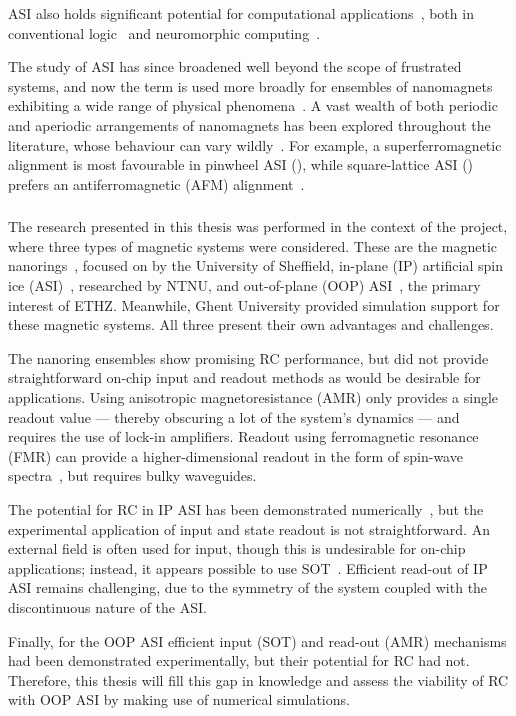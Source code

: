 ASI also holds significant potential for computational applications~\cite{heyderman2022spin}, both in conventional logic~\cite{ComputationalLogic_2018,Gypens_Balanced,EngineeringRelaxationComputation} and neuromorphic computing~\cite{ASI_computation,RC_RecentAdvances}. \par
The study of ASI has since broadened well beyond the scope of frustrated systems, and now the term is used more broadly for ensembles of nanomagnets exhibiting a wide range of physical phenomena~\cite{ASIPathsForward}.
A vast wealth of both periodic and aperiodic arrangements of nanomagnets has been explored throughout the literature, whose behaviour can vary wildly~\cite{nisoli2013colloquium,heyderman2013artificial,AdvancesASI,ASI_Evolutionary_ALife}.
For example, a superferromagnetic alignment is most favourable in pinwheel ASI (), while square-lattice ASI () prefers an antiferromagnetic (AFM) alignment~\cite{ApparentFMpinwheel}.

\subsubsection{\spinengine}
The research presented in this thesis was performed in the context of the \spinengine project, where three types of magnetic systems were considered.
These are the magnetic nanorings~\cite{DynamicEmergence_NanomagneticSystem}, focused on by the University of Sheffield, in-plane (IP) artificial spin ice (ASI)~\cite{RC_ASI}, researched by NTNU, and out-of-plane (OOP) ASI~\cite{KUR-24}, the primary interest of ETHZ.
Meanwhile, Ghent University provided simulation support for these magnetic systems.
All three present their own advantages and challenges. \par
The nanoring ensembles show promising RC performance, but did not provide straightforward on-chip input and readout methods as would be desirable for applications.
Using anisotropic magnetoresistance (AMR) only provides a single readout value --- thereby obscuring a lot of the system's dynamics --- and requires the use of lock-in amplifiers.
Readout using ferromagnetic resonance (FMR) can provide a higher-dimensional readout in the form of spin-wave spectra~\cite{swindells2024fingerprinting}, but requires bulky waveguides. \par
The potential for RC in IP ASI has been demonstrated numerically~\cite{RC_ASI}, but the experimental application of input and state readout is not straightforward.
An external field is often used for input, though this is undesirable for on-chip applications; instead, it appears possible to use SOT~\cite{SOT_switching_IP}.
Efficient read-out of IP ASI remains challenging, due to the symmetry of the system coupled with the discontinuous nature of the ASI. \par %
Finally, for the OOP ASI efficient input (SOT) and read-out (AMR) mechanisms had been demonstrated experimentally, but their potential for RC had not.
Therefore, this thesis will fill this gap in knowledge and assess the viability of RC with OOP ASI by making use of numerical simulations.

